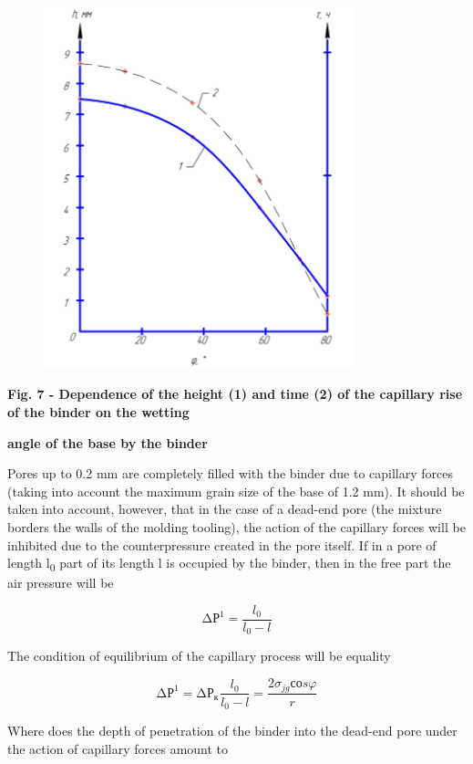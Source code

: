 \begin{figure}[H]
	\centering
	\includegraphics[width=0.8\textwidth]{media/gorn2/image10}
	\caption*{}
\end{figure}


{\bfseries Fig. 7 - Dependence of the height (1) and time (2) of the
capillary rise of the binder on the wetting}

{\bfseries angle of the base by the binder}

Pores up to 0.2 mm are completely filled with the binder due to
capillary forces (taking into account the maximum grain size of the base
of 1.2 mm). It should be taken into account, however, that in the case
of a dead-end pore (the mixture borders the walls of the molding
tooling), the action of the capillary forces will be inhibited due to
the counterpressure created in the pore itself. If in a pore of length
l\textsubscript{0} part of its length l is occupied by the binder, then
in the free part the air pressure will be

\[\mathrm{\Delta}Р^{1} = \frac{l_{0}}{l_{0} - l}\]

The condition of equilibrium of the capillary process will be equality

\[\mathrm{\Delta}Р^{1} = \mathrm{\Delta}{Р_{к}}^{}\frac{l_{0}}{l_{0} - l} = \frac{2\sigma_{jg}соs\varphi}{r}\]

Where does the depth of penetration of the binder into the dead-end pore
under the action of capillary forces amount to

